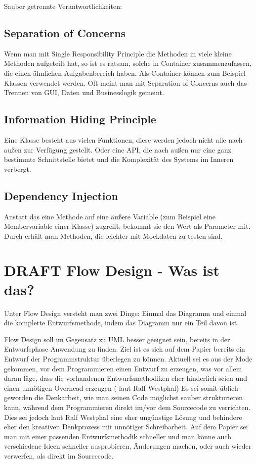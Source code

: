 \documentclass[a4paper,12pt,oneside]{book}
\begin{document}
Sauber getrennte Verantwortlichkeiten:
\subsection{Separation of Concerns}
\label{sec-1-3-4}
Wenn man mit Single Responsibility Principle die Methoden in viele kleine
Methoden aufgeteilt hat, so ist es ratsam, solche in Container
zusammenzufassen, die einen ähnlichen Aufgabenbereich haben.
Als Container können zum Beispiel Klassen verwendet werden.
Oft meint man mit Separation of Concerns auch das Trennen von
GUI, Daten und Businesslogik gemeint.

\subsection{Information Hiding Principle}
\label{sec-1-3-5}
Eine Klasse besteht aus vielen Funktionen, diese werden jedoch nicht alle nach
außen zur Verfügung gestellt.
Oder eine API, die nach außen nur eine ganz bestimmte Schnittstelle bietet und
die Komplexität des Systems im Inneren verbergt.

\subsection{Dependency Injection}
\label{sec-1-3-6}
Anstatt das eine Methode auf eine äußere Variable (zum Beispiel eine Membervariable einer
Klasse) zugreift, bekommt sie den Wert als Parameter mit.
Durch erhält man Methoden, die leichter mit Mockdaten zu testen sind.




\section{DRAFT Flow Design - Was ist das?}
\label{sec-1-4}

Unter Flow Design versteht man zwei Dinge:
Einmal das Diagramm und einmal die komplette Entwurfsmethode, indem das
Diagramm nur ein Teil davon ist.

Flow Design soll im Gegensatz zu UML besser geeignet sein, bereits in der Entwurfsphase Anwendung zu finden.
Ziel ist es sich auf dem Papier bereits ein Entwurf der Programmstruktur überlegen zu können.
Aktuell sei es aus der Mode gekommen, vor dem Programmieren einen Entwurf zu erzeugen, was vor allem daran läge, dass die vorhandenen
Entwurfsmethodiken eher hinderlich seien und einen unnötigen Overhead erzeugen ( laut Ralf Westphal)
Es sei somit üblich geworden die Denkarbeit, wie man seinen Code möglichst sauber strukturieren kann,
während dem Programmieren direkt im/vor dem Sourcecode zu verrichten.
Dies sei jedoch laut Ralf Westphal eine eher ungünstige Lösung und behindere eher den kreativen Denkprozess mit
unnötiger Schreibarbeit.
Auf dem Papier sei man mit einer passenden Entwurfsmethodik schneller und man könne auch verschiedene Ideen schneller
ausprobieren, Änderungen machen, oder auch wieder verwerfen, als direkt im Sourcecode.
\end{document}
